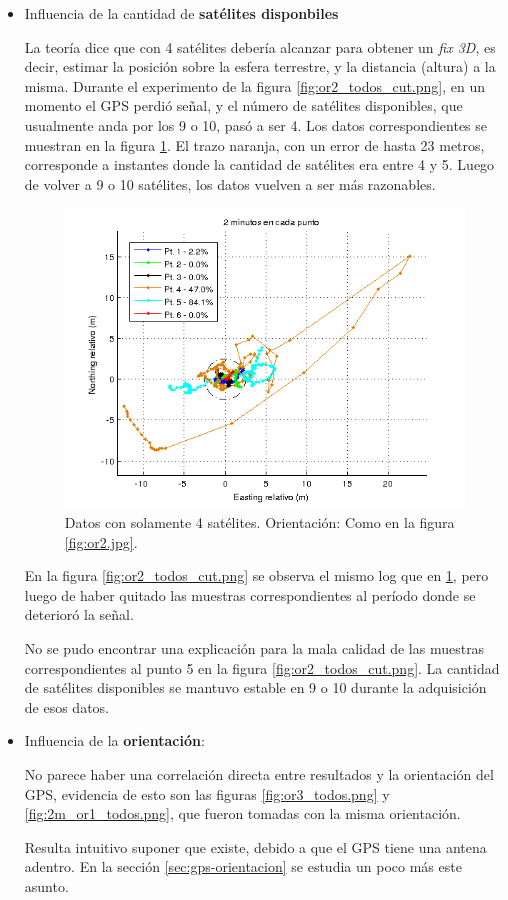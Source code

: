 \documentclass[spanish,12pt,a4paper,titlepage]{report}
\begin{document}
\begin{itemize}
\item Influencia de la cantidad de \textbf{satélites disponbiles}

La teoría dice que con 4 satélites debería alcanzar para obtener un \textit{fix 3D}, es decir, estimar la posición sobre la esfera terrestre, y la distancia (altura) a la misma. Durante el experimento de la figura \ref{fig:or2_todos_cut.png}, en un momento el GPS perdió señal, y el número de satélites disponibles, que usualmente anda por los 9 o 10, pasó a ser 4. Los datos correspondientes se muestran en la figura \ref{fig:or2_todos_sat_mal.png}. El trazo naranja, con un error de hasta 23 metros, corresponde a instantes donde la cantidad de satélites era entre 4 y 5. Luego de volver a 9 o 10 satélites, los datos vuelven a ser más razonables.

\begin{figure}[h!]
  \includegraphics[width=1\textwidth]{./img/or2_todos_sat_mal.png}
  \caption{Datos con solamente 4 satélites. Orientación: Como en la figura \ref{fig:or2.jpg}.}
  \label{fig:or2_todos_sat_mal.png}
\end{figure}

En la figura \ref{fig:or2_todos_cut.png} se observa el mismo log que en \ref{fig:or2_todos_sat_mal.png}, pero luego de haber quitado las muestras correspondientes al período donde se deterioró la señal.

No se pudo encontrar una explicación para la mala calidad de las muestras correspondientes al punto 5 en la figura \ref{fig:or2_todos_cut.png}. La cantidad de satélites disponibles se mantuvo estable en 9 o 10 durante la adquisición de esos datos.
\item Influencia de la \textbf{orientación}:

No parece haber una correlación directa entre resultados y la orientación del GPS, evidencia de esto son las figuras \ref{fig:or3_todos.png} y \ref{fig:2m_or1_todos.png}, que fueron tomadas con la misma orientación.

Resulta  intuitivo suponer que existe, debido a que el GPS tiene una antena adentro. En la sección \ref{sec:gps-orientacion} se estudia un poco más este asunto.
\end{itemize}
\end{document}
